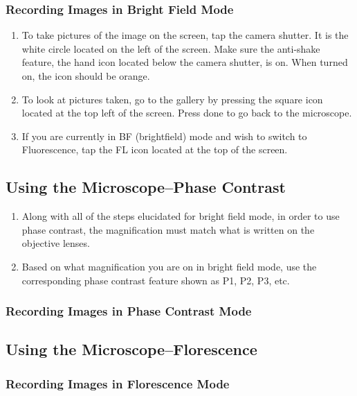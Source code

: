\documentclass{article}
\begin{document}
\subsubsection{Recording Images in Bright Field Mode}

\begin{enumerate}
  \item To take pictures of the image on the screen, tap the camera shutter. It is the white circle located on the left of the screen. Make sure the anti-shake feature, the hand icon located below the camera shutter, is on. When turned on, the icon should be orange.
  \item To look at pictures taken, go to the gallery by pressing the square icon located at the top left of the screen. Press done to go back to the microscope. 
  \item If you are currently in BF (brightfield) mode and wish to switch to Fluorescence, tap the FL icon located at the top of the screen.  
\end{enumerate}


\subsection{Using the Microscope--Phase Contrast}
\begin{enumerate}
  \item Along with all of the steps elucidated for bright field mode, in order to use phase contrast, the magnification must match what is written on the objective lenses.
  \item Based on what magnification you are on in bright field mode, use the corresponding phase contrast feature shown as P1, P2, P3, etc. 
\end{enumerate}


\subsubsection{Recording Images in Phase Contrast Mode}



\subsection{Using the Microscope--Florescence}



\subsubsection{Recording Images in Florescence Mode}
\end{document}
